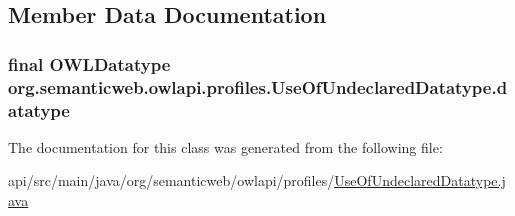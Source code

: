 \subsection{Member Data Documentation}
\hypertarget{classorg_1_1semanticweb_1_1owlapi_1_1profiles_1_1_use_of_undeclared_datatype_a5ee736da309c9b82ffba64dd4f8363ea}{
\subsubsection[{datatype}]{\setlength{\rightskip}{0pt plus 5cm}final {\bf O\-W\-L\-Datatype} org.\-semanticweb.\-owlapi.\-profiles.\-Use\-Of\-Undeclared\-Datatype.\-datatype\hspace{0.3cm}{\ttfamily [private]}}}\label{classorg_1_1semanticweb_1_1owlapi_1_1profiles_1_1_use_of_undeclared_datatype_a5ee736da309c9b82ffba64dd4f8363ea}


The documentation for this class was generated from the following file\-:\begin{DoxyCompactItemize}
\item 
api/src/main/java/org/semanticweb/owlapi/profiles/\hyperlink{_use_of_undeclared_datatype_8java}{Use\-Of\-Undeclared\-Datatype.\-java}\end{DoxyCompactItemize}
